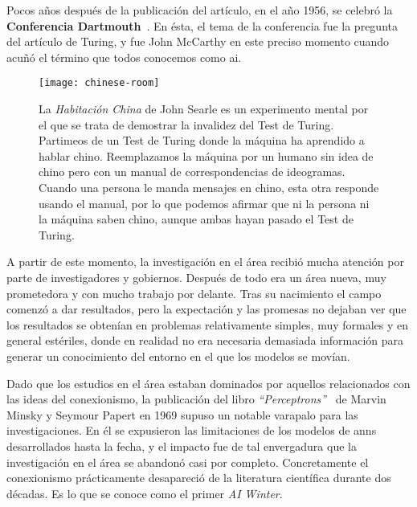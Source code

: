 Pocos años después de la publicación del artículo, en el año 1956, se celebró la \textbf{Conferencia Dartmouth}~\cite{mccarthy1956dartmouth}. En ésta, el tema de la conferencia fue la pregunta del artículo de Turing, y fue John McCarthy en este preciso momento cuando acuñó el término que todos conocemos como \ac{ai}.

\begin{figure}[!b]
	\centering
	\texttt{[image: chinese-room]}
	\label{fig:chinese-room}
	\caption[Experimento mental de la \textit{Habitación China}, por John Searle]{La \textit{Habitación China} de John Searle es un experimento mental por el que se trata de demostrar la invalidez del Test de Turing. Partimeos de un Test de Turing donde la máquina ha aprendido a hablar chino. Reemplazamos la máquina por un humano sin idea de chino pero con un manual de correspondencias de ideogramas. Cuando una persona le manda mensajes en chino, esta otra responde usando el manual, por lo que podemos afirmar que ni la persona ni la máquina saben chino, aunque ambas hayan pasado el Test de Turing.}
\end{figure}

A partir de este momento, la investigación en el área recibió mucha atención por parte de investigadores y gobiernos. Después de todo era un área nueva, muy prometedora y con mucho trabajo por delante. Tras su nacimiento el campo comenzó a dar resultados, pero la expectación y las promesas no dejaban ver que los resultados se obtenían en problemas relativamente simples, muy formales y en general estériles, donde en realidad no era necesaria demasiada información para generar un conocimiento del entorno en el que los modelos se movían.

Dado que los estudios en el área estaban dominados por aquellos relacionados con las ideas del conexionismo, la publicación del libro \textit{\enquote{Perceptrons}}~\cite{minsky1969perceptrons} de Marvin Minsky y Seymour Papert en 1969 supuso un notable varapalo para las investigaciones. En él se expusieron las limitaciones de los modelos de \acp{ann} desarrollados hasta la fecha, y el impacto fue de tal envergadura que la investigación en el área se abandonó casi por completo. Concretamente el conexionismo prácticamente desapareció de la literatura científica durante dos décadas. Es lo que se conoce como el primer \textit{AI Winter}.

